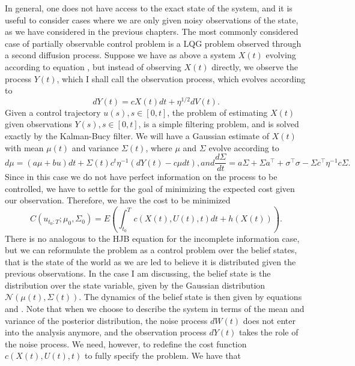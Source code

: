 In general, one does not have access to the exact state of the system, and it is useful to consider cases where we are only given noisy observations of the state, as we have considered in the previous chapters. The most commonly considered case of partially observable control problem is a LQG problem observed through a second diffusion process. Suppose we have as above a system $X(t)$ evolving according to equation , but instead of observing $X(t)$ directly, we observe the process $Y(t)$, which I shall call the observation process, which evolves according to
\begin{equation}
\label{eqn:ctl_obs_dyn}
dY(t) = c X(t) dt + \eta^{1/2} dV(t).
\end{equation}
Given a control trajectory ${u(s), s\in [0,t]}$, the problem of estimating $X(t)$ given observations ${Y(s), s \in [0,t]}$, is a simple filtering problem, and is solved exactly by the Kalman-Bucy filter. We will have a Gaussian estimate of $X(t)$ with mean $\mu(t)$ and variance $\Sigma(t)$, where $\mu$ and $\Sigma$ evolve according to
\begin{subequations}
\begin{equation}
d\mu = (a \mu + b u)dt + \Sigma(t) c^t \eta^{-1} \left(dY(t) - c\mu dt\right),
\label{eq:ctl_kalman_bucy_mean}
\end{equation}
and
\begin{equation}
\label{eq:ctl_kalman_bucy_var}
\frac{d\Sigma}{dt} = a \Sigma + \Sigma a^\top + \sigma^\top \sigma - \Sigma c^\top \eta^{-1} c \Sigma.
\end{equation}
\end{subequations}
Since in this case we do not have perfect information on the process to be controlled, we have to settle for the goal of minimizing the expected cost given our observation. Therefore, we have the cost to be minimized
$$
C(u_{t_0:T};\mu_0,\Sigma_0) = E\left(\int_{t_0}^T c(X(t),U(t),t)dt +h(X(t))\right).
$$
There is no analogous to the HJB equation for the incomplete information case, but we can reformulate the problem as a control problem over the belief states, that is the state of the world as we are led to believe it is distributed given the previous observations. In the case I am discussing, the belief state is the distribution over the state variable, given by the Gaussian distribution $\mathcal{N}(\mu(t),\Sigma(t))$. The dynamics of the belief state is then given by equations  and . Note that when we choose to describe the system in terms of the mean and variance of the posterior distribution, the noise process $dW(t)$ does not enter into the analysis anymore, and the observation process $dY(t)$ takes the role of the noise process. We need, however, to redefine the cost function $c(X(t),U(t),t)$ to fully specify the problem. We have that
